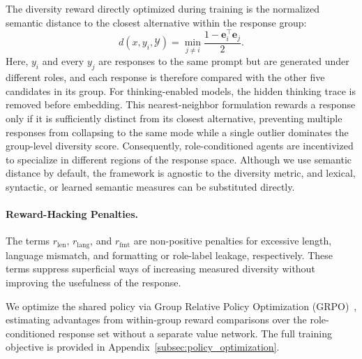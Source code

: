 The diversity reward directly optimized during training is the normalized semantic distance to the closest alternative within the response group:
\begin{equation}
d(x,y_i,\mathcal{Y})
=
\min_{j\neq i}
\frac{1-\mathbf{e}_i^\top\mathbf{e}_j}{2}.
\label{eq:training-sbert-diversity}
\end{equation}
Here, $y_i$ and every $y_j$ are responses to the same prompt but are generated under different roles, and each response is therefore compared with the other five candidates in its group. For thinking-enabled models, the hidden thinking trace is removed before embedding. This nearest-neighbor formulation rewards a response only if it is sufficiently distinct from its closest alternative, preventing multiple responses from collapsing to the same mode while a single outlier dominates the group-level diversity score. Consequently, role-conditioned agents are incentivized to specialize in different regions of the response space. Although we use semantic distance by default, the framework is agnostic to the diversity metric, and lexical, syntactic, or learned semantic measures can be substituted directly.

\paragraph{Reward-Hacking Penalties.}
The terms $r_{\mathrm{len}}$, $r_{\mathrm{lang}}$, and $r_{\mathrm{fmt}}$ are non-positive penalties for excessive length, language mismatch, and formatting or role-label leakage, respectively. These terms suppress superficial ways of increasing measured diversity without improving the usefulness of the response.

We optimize the shared policy via Group Relative Policy Optimization (GRPO)~\citep{shao2024deepseekmath}, estimating advantages from within-group reward comparisons over the role-conditioned response set without a separate value network. The full training objective is provided in Appendix~\ref{subsec:policy_optimization}.

